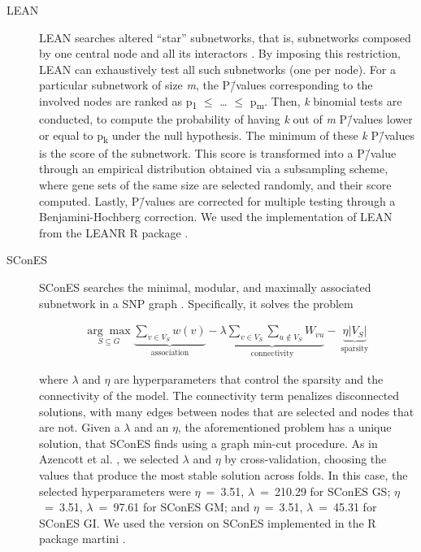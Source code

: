 \documentclass[10pt,letterpaper]{article}
\begin{document}
\begin{description}
\item[{LEAN}] LEAN searches altered ``star'' subnetworks, that is, subnetworks composed by one central node and all its interactors \cite{gwinner_network-based_2016}. By imposing this restriction, LEAN can exhaustively test all such subnetworks (one per node). For a particular subnetwork of size \emph{m}, the P\=/values corresponding to the involved nodes are ranked as p\textsubscript{1} \(\le\) \dots{} \(\le\) p\textsubscript{m}. Then, \emph{k} binomial tests are conducted, to compute the probability of having \emph{k} out of \emph{m} P\=/values lower or equal to p\textsubscript{k} under the null hypothesis. The minimum of these \emph{k} P\=/values is the score of the subnetwork. This score is transformed into a P\=/value through an empirical distribution obtained via a subsampling scheme, where gene sets of the same size are selected randomly, and their score computed. Lastly, P\=/values are corrected for multiple testing through a Benjamini-Hochberg correction. We used the implementation of LEAN from the LEANR R package \cite{leanr}.
\item[{SConES}] SConES searches the minimal, modular, and maximally associated subnetwork in a SNP graph \cite{azencott_efficient_2013}. Specifically, it solves the problem

\begin{eqnarray}
\label{eq:scones}
\underset{S \subseteq G}{\arg \max } \underbrace{\sum_{v \in V_S} w(v)}_{\text { association }} - \underbrace{\lambda \sum_{v \in V_S} \sum_{u \not\in V_S} {W}_{vu} }_{\text { connectivity }}-\underbrace{\eta \lvert V_S \rvert }_{\text { sparsity }}
\end{eqnarray}

where \(\lambda\) and \(\eta\) are hyperparameters that control the sparsity and the connectivity of the model. The connectivity term penalizes disconnected solutions, with many edges between nodes that are selected and nodes that are not. Given a $\lambda$ and an $\eta$, the aforementioned problem has a unique solution, that SConES finds using a graph min-cut procedure. As in Azencott et al. \cite{azencott_efficient_2013}, we selected \(\lambda\) and \(\eta\) by cross-validation, choosing the values that produce the most stable solution across folds. In this case, the selected hyperparameters were \(\eta\)~=~3.51, \(\lambda\)~=~210.29 for SConES GS; \(\eta\)~=~3.51, \(\lambda\)~=~97.61 for SConES GM; and \(\eta\)~=~3.51, \(\lambda\)~=~45.31 for SConES GI. We used the version on SConES implemented in the R package martini \cite{martini}.


\end{description}
\end{document}
